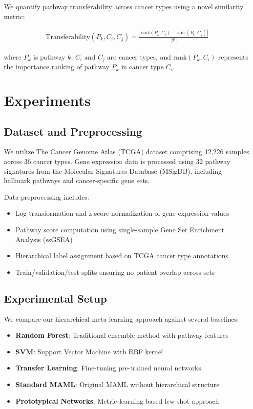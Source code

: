 \documentclass{article}
\begin{document}
We quantify pathway transferability across cancer types using a novel similarity metric:

\begin{align}
\text{Transferability}(P_k, C_i, C_j) = \frac{|\text{rank}(P_k, C_i) - \text{rank}(P_k, C_j)|}{|\mathcal{P}|}
\end{align}

where $P_k$ is pathway $k$, $C_i$ and $C_j$ are cancer types, and $\text{rank}(P_k, C_i)$ represents the importance ranking of pathway $P_k$ in cancer type $C_i$.

\section{Experiments}

\subsection{Dataset and Preprocessing}

We utilize The Cancer Genome Atlas (TCGA) dataset comprising 12,226 samples across 36 cancer types. Gene expression data is processed using 32 pathway signatures from the Molecular Signatures Database (MSigDB), including hallmark pathways and cancer-specific gene sets.

Data preprocessing includes:
\begin{itemize}
\item Log-transformation and z-score normalization of gene expression values
\item Pathway score computation using single-sample Gene Set Enrichment Analysis (ssGSEA)
\item Hierarchical label assignment based on TCGA cancer type annotations
\item Train/validation/test splits ensuring no patient overlap across sets
\end{itemize}

\subsection{Experimental Setup}

We compare our hierarchical meta-learning approach against several baselines:

\begin{itemize}
\item \textbf{Random Forest}: Traditional ensemble method with pathway features
\item \textbf{SVM}: Support Vector Machine with RBF kernel
\item \textbf{Transfer Learning}: Fine-tuning pre-trained neural networks
\item \textbf{Standard MAML}: Original MAML without hierarchical structure
\item \textbf{Prototypical Networks}: Metric-learning based few-shot approach
\end{itemize}
\end{document}
